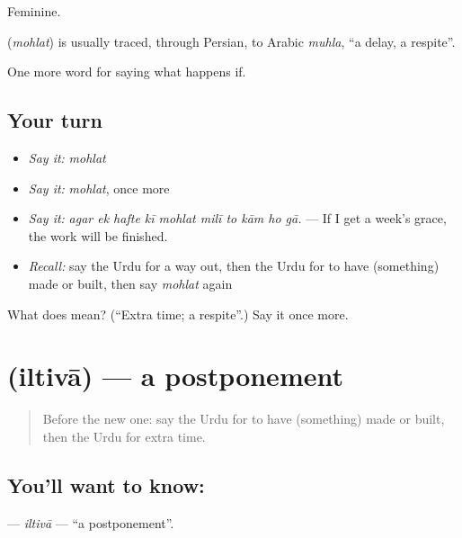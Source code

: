 Feminine.

\begin{cousinweb}
\textbf{} (\emph{mohlat}) is usually traced, through Persian, to Arabic \emph{muhla}, \textquotedblleft{}a delay, a respite\textquotedblright{}.
\end{cousinweb}

\begin{grammarlens}[title={What you've built}]
One more word for saying what happens if.
\end{grammarlens}

\subsection*{Your turn}
\begin{itemize}
\raggedright
  \item \emph{Say it:} \emph{mohlat}
  \item \emph{Say it:} \emph{mohlat}, once more
  \item \emph{Say it:} \emph{agar ek hafte kī mohlat milī to kām ho gā.} — If I get a week's grace, the work will be finished.
  \item \emph{Recall:} say the Urdu for a way out, then the Urdu for to have (something) made or built, then say \emph{mohlat} again
\end{itemize}

\begin{tcolorbox}[breakable,colback=teal!4,colframe=teal!35!black,title={Before you move on}]
What does  mean? (\textquotedblleft{}Extra time; a respite\textquotedblright{}.) Say it once more.
\end{tcolorbox}
\section[\texorpdfstring{\ur{التوا} (iltivā)}{التوا (iltivā)}]{ (iltivā) — a postponement}

\label{lesson:UR-C525-iltiva}



\begin{quote}
Before the new one: say the Urdu for to have (something) made or built, then the Urdu for extra time.
\end{quote}

\subsection*{You'll want to know: }
\textbf{} — \emph{iltivā} — \textquotedblleft{}a postponement\textquotedblright{}.

